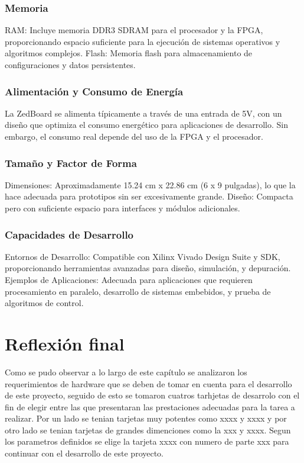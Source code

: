 \subsubsection{Memoria}
RAM: Incluye memoria DDR3 SDRAM para el procesador y la FPGA, proporcionando espacio suficiente para la ejecución de sistemas operativos y algoritmos complejos.
Flash: Memoria flash para almacenamiento de configuraciones y datos persistentes.
\subsubsection{Alimentación y Consumo de Energía}
La ZedBoard se alimenta típicamente a través de una entrada de 5V, con un diseño que optimiza el consumo energético para aplicaciones de desarrollo. Sin embargo, el consumo real depende del uso de la FPGA y el procesador.
\subsubsection{Tamaño y Factor de Forma}
Dimensiones: Aproximadamente 15.24 cm x 22.86 cm (6 x 9 pulgadas), lo que la hace adecuada para prototipos sin ser excesivamente grande.
Diseño: Compacta pero con suficiente espacio para interfaces y módulos adicionales.
\subsubsection{Capacidades de Desarrollo}
Entornos de Desarrollo: Compatible con Xilinx Vivado Design Suite y SDK, proporcionando herramientas avanzadas para diseño, simulación, y depuración.
Ejemplos de Aplicaciones: Adecuada para aplicaciones que requieren procesamiento en paralelo, desarrollo de sistemas embebidos, y prueba de algoritmos de control.

\section{Reflexión final}

Como se pudo observar a lo largo de este capítulo se analizaron los requerimientos de hardware que se deben de tomar en cuenta para el desarrollo de este proyecto, seguido de esto se tomaron cuatros tarhjetas de desarrolo con el fin de elegir entre las que presentaran las prestaciones adecuadas para la tarea a realizar. Por un lado se tenian tarjetas muy potentes como xxxx y xxxx y por otro lado se tenian tarjetas de grandes dimenciones como la xxx y xxxx. Segun los parametros definidos se elige la tarjeta xxxx con numero de parte xxx para continuar con el desarrollo de este proyecto.